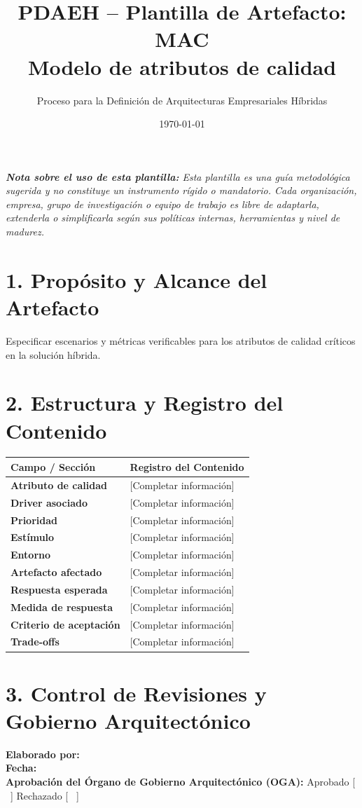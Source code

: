 \documentclass[11pt,a4paper]{article}
\title{\textbf{\color{brandgreen} PDAEH -- Plantilla de Artefacto: MAC} \\[0.3em] \large Modelo de atributos de calidad}
\author{Proceso para la Definición de Arquitecturas Empresariales Híbridas}
\date{\today}
\begin{document}
\maketitle

\noindent \textit{\textbf{Nota sobre el uso de esta plantilla:} Esta plantilla es una guía metodológica sugerida y no constituye un instrumento rígido o mandatorio. Cada organización, empresa, grupo de investigación o equipo de trabajo es libre de adaptarla, extenderla o simplificarla según sus políticas internas, herramientas y nivel de madurez.}

\section*{1. Propósito y Alcance del Artefacto}
Especificar escenarios y métricas verificables para los atributos de calidad críticos en la solución híbrida.

\section*{2. Estructura y Registro del Contenido}
\begin{tabularx}{\textwidth}{|>{\bfseries}p{4.5cm}|X|}
    \hline
    \rowcolor[gray]{0.92} Campo / Sección & Registro del Contenido \\ \hline
    \textbf{Atributo de calidad} & [Completar información] \\ \hline
    \textbf{Driver asociado} & [Completar información] \\ \hline
    \textbf{Prioridad} & [Completar información] \\ \hline
    \textbf{Estímulo} & [Completar información] \\ \hline
    \textbf{Entorno} & [Completar información] \\ \hline
    \textbf{Artefacto afectado} & [Completar información] \\ \hline
    \textbf{Respuesta esperada} & [Completar información] \\ \hline
    \textbf{Medida de respuesta} & [Completar información] \\ \hline
    \textbf{Criterio de aceptación} & [Completar información] \\ \hline
    \textbf{Trade-offs} & [Completar información] \\ \hline
\end{tabularx}

\vspace{1.2cm}
\section*{3. Control de Revisiones y Gobierno Arquitectónico}
\noindent \textbf{Elaborado por:} \hrulefill \\[0.5em]
\textbf{Fecha:} \hrulefill \\[0.5em]
\textbf{Aprobación del Órgano de Gobierno Arquitectónico (OGA):} Aprobado [ \, ] \quad Rechazado [ \, ]
\end{document}
